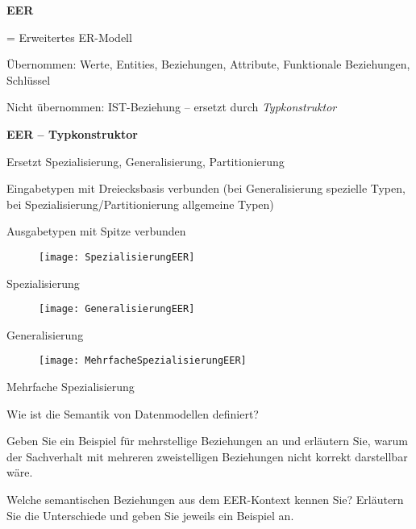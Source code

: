 \textbf{EER}
\begin{items}
	\item = Erweitertes ER-Modell
	\item Übernommen: Werte, Entities, Beziehungen, Attribute, Funktionale Beziehungen, Schlüssel
	\item Nicht übernommen: IST-Beziehung -- ersetzt durch \emph{Typkonstruktor}
\end{items}

\textbf{EER -- Typkonstruktor}
\begin{items}
	\item Ersetzt Spezialisierung, Generalisierung, Partitionierung
	\item Eingabetypen mit Dreiecksbasis verbunden (bei Generalisierung spezielle Typen, bei Spezialisierung/Partitionierung allgemeine Typen)
	\item Ausgabetypen mit Spitze verbunden
\end{items}
\begin{center}
	\begin{figure}[H]\centering\label{SpezialisierungEER}\texttt{[image: SpezialisierungEER]}\end{figure}
	Spezialisierung
	\begin{figure}[H]\centering\label{GeneralisierungEER}\texttt{[image: GeneralisierungEER]}\end{figure}
	Generalisierung
	\begin{figure}[H]\centering\label{MehrfacheSpezialisierungEER}\texttt{[image: MehrfacheSpezialisierungEER]}\end{figure}
	Mehrfache Spezialisierung
\end{center}

\begin{fragen}
	\begin{enumeration}
		\item Wie ist die Semantik von Datenmodellen definiert?
		\item Geben Sie ein Beispiel für mehrstellige Beziehungen an und erläutern Sie, warum der Sachverhalt mit mehreren zweistelligen Beziehungen nicht korrekt darstellbar wäre.
		\item Welche semantischen Beziehungen aus dem EER-Kontext kennen Sie? Erläutern Sie die Unterschiede und geben Sie jeweils ein Beispiel an.
	\end{enumeration}
\end{fragen}
